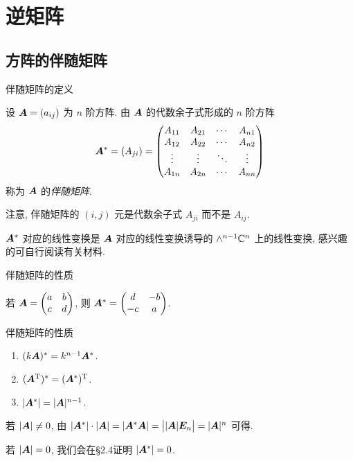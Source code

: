 \section{逆矩阵}

\subsection{方阵的伴随矩阵}

\begin{frame}{伴随矩阵的定义}
	\onslide<+->
	\begin{definition}[伴随矩阵]
		设 ${\boldsymbol{A}}=(a_{ij})$ 为 $n$ 阶方阵.
		由 ${\boldsymbol{A}}$ 的代数余子式形成的 $n$ 阶方阵
		\[{\boldsymbol{A}}^*=(A_{ji})=\begin{pmatrix}
			A_{11}&A_{21}&\cdots&A_{n1}\\
			A_{12}&A_{22}&\cdots&A_{n2}\\
			\vdots&\vdots&\ddots&\vdots\\
			A_{1n}&A_{2n}&\cdots&A_{nn}
		\end{pmatrix}\]
		称为 ${\boldsymbol{A}}$ 的\emph{伴随矩阵}.
	\end{definition}
	\onslide<+->
	注意, 伴随矩阵的 $(i,j)$ 元是代数余子式 \alert{$A_{ji}$ 而不是 $A_{ij}$}.

	\onslide<+->
	${\boldsymbol{A}}^*$ 对应的线性变换是 ${\boldsymbol{A}}$ 对应的线性变换诱导的 $\wedge^{n-1}{\mathbb{C}}^n$ 上的线性变换, 感兴趣的可自行阅读有关材料.
\end{frame}


\begin{frame}{伴随矩阵的性质}
	\onslide<+->
	\begin{example}
		若 ${\boldsymbol{A}}=\begin{pmatrix}
			a&b\\c&d
		\end{pmatrix}$, 则 ${\boldsymbol{A}}^*=\begin{pmatrix}
			d&-b\\-c&a
		\end{pmatrix}$.
	\end{example}
	\onslide<+->
	\begin{second}{伴随矩阵的性质}
		\begin{enumerate}
			\item $(k{\boldsymbol{A}})^*=k^{n-1}{\boldsymbol{A}}^*$.
			\item $({\boldsymbol{A}}^{\mathrm{T}})^*=({\boldsymbol{A}}^*)^{\mathrm{T}}$.
			\item \alert{$|{\boldsymbol{A}}^*|=|{\boldsymbol{A}}|^{n-1}$}.
		\end{enumerate}
	\end{second}
	\onslide<+->
	若 $|{\boldsymbol{A}}|\neq0$, 由 $|{\boldsymbol{A}}^*|\cdot|{\boldsymbol{A}}|=|{\boldsymbol{A}}^*{\boldsymbol{A}}|=\bigl||{\boldsymbol{A}}|{\boldsymbol{E}}_n\bigr|=|{\boldsymbol{A}}|^n$ 可得.

	\onslide<+->
	若 $|{\boldsymbol{A}}|=0$, 我们会在\S2.4证明 $|{\boldsymbol{A}}^*|=0$.
\end{frame}


